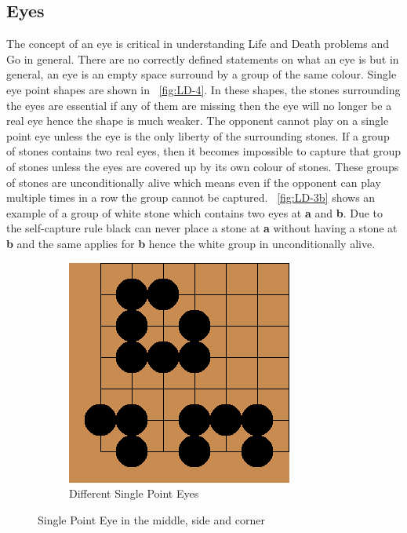 \documentclass{l4proj}
\newcommand{\bo}[1]{\textbf{#1}}
\begin{document}
\subsection{Eyes}
The concept of an eye is critical in understanding Life and Death problems and Go in general. There are no correctly defined statements on what an eye is but in general, an eye is an empty space surround by a group of the same colour. Single eye point shapes are shown in ~\autoref{fig:LD-4}. In these shapes, the stones surrounding the eyes are essential if any of them are missing then the eye will no longer be a real eye hence the shape is much weaker. The opponent cannot play on a single point eye unless the eye is the only liberty of the surrounding stones. If a group of stones contains two real eyes, then it becomes impossible to capture that group of stones unless the eyes are covered up by its own colour of stones. These groups of stones are unconditionally alive which means even if the opponent can play multiple times in a row the group cannot be captured. ~\autoref{fig:LD-3b} shows an example of a group of white stone which contains two eyes at \bo{a} and \bo{b}. Due to the self-capture rule black can never place a stone at \bo{a} without having a stone at \bo{b} and the same applies for \bo{b} hence the white group in unconditionally alive.

\begin{figure}[!ht]
\centering
\begin{subfigure}[b]{0.3\textwidth}
\includegraphics[width=\textwidth]{LD/4.png}
\caption{Different Single Point Eyes}
\label{fig:LD-4a}
\end{subfigure}
\caption{Single Point Eye in the middle, side and corner}
\label{fig:LD-4}
\end{figure}
\end{document}
